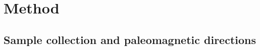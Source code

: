 \documentclass[draft]{agujournal2019}
\begin{document}




\section*{Method}


\subsection*{Sample collection and paleomagnetic directions}
\end{document}
